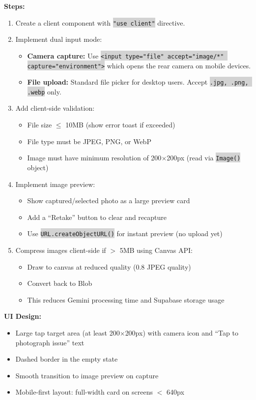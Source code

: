 \documentclass[11pt, a4paper]{article}
\newcommand{\code}[1]{\texttt{\small\colorbox{lightgray}{#1}}}
\begin{document}
\textbf{Steps:}
\begin{enumerate}[leftmargin=2em, itemsep=2pt]
  \item Create a client component with \code{"use client"} directive.
  \item Implement dual input mode:
    \begin{itemize}[itemsep=1pt]
      \item \textbf{Camera capture:} Use \code{<input type="file" accept="image/*" capture="environment">} which opens the rear camera on mobile devices.
      \item \textbf{File upload:} Standard file picker for desktop users. Accept \code{.jpg, .png, .webp} only.
    \end{itemize}
  \item Add client-side validation:
    \begin{itemize}[itemsep=1pt]
      \item File size $\leq$ 10MB (show error toast if exceeded)
      \item File type must be JPEG, PNG, or WebP
      \item Image must have minimum resolution of 200$\times$200px (read via \code{Image()} object)
    \end{itemize}
  \item Implement image preview:
    \begin{itemize}[itemsep=1pt]
      \item Show captured/selected photo as a large preview card
      \item Add a ``Retake'' button to clear and recapture
      \item Use \code{URL.createObjectURL()} for instant preview (no upload yet)
    \end{itemize}
  \item Compress images client-side if $>$ 5MB using Canvas API:
    \begin{itemize}[itemsep=1pt]
      \item Draw to canvas at reduced quality (0.8 JPEG quality)
      \item Convert back to Blob
      \item This reduces Gemini processing time and Supabase storage usage
    \end{itemize}
\end{enumerate}

\textbf{UI Design:}
\begin{itemize}[leftmargin=2em, itemsep=1pt]
  \item Large tap target area (at least 200$\times$200px) with camera icon and ``Tap to photograph issue'' text
  \item Dashed border in the empty state
  \item Smooth transition to image preview on capture
  \item Mobile-first layout: full-width card on screens $<$ 640px
\end{itemize}
\end{document}
